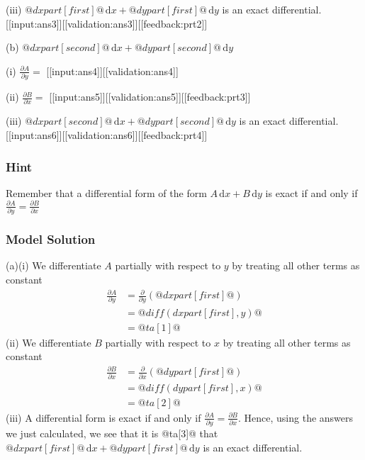 \documentclass[a4paper,10pt]{article}
\begin{document}
(iii) $@dxpart[first]@ \, \text{d}x + @dypart[first]@ \, \text{d}y$ is an exact differential. [[input:ans3]][[validation:ans3]][[feedback:prt2]]

(b) $@dxpart[second]@ \, \text{d}x + @dypart[second]@ \, \text{d}y$

(i) $\frac{\partial A}{\partial y} = $ [[input:ans4]][[validation:ans4]]

(ii) $\frac{\partial B}{\partial x} = $ [[input:ans5]][[validation:ans5]][[feedback:prt3]]

(iii) $@dxpart[second]@ \, \text{d}x + @dypart[second]@ \, \text{d}y$ is an exact differential. [[input:ans6]][[validation:ans6]][[feedback:prt4]]
\subsubsection{Hint}
Remember that a differential form of the form $A \, \text{d}x + B \, \text{d}y$ is exact if and only if $\frac{\partial A}{\partial y} = \frac{\partial B}{\partial x}$
\subsubsection{Model Solution}
(a)(i) We differentiate $A$ partially with respect to $y$ by treating all other terms as constant \begin{align*} \frac{\partial A}{\partial y} &= \frac{\partial}{\partial y} \left( @dxpart[first]@ \right) \\ &= @diff(dxpart[first],y)@  \\ &= @ta[1]@ \end{align*}(ii) We differentiate $B$ partially with respect to $x$ by treating all other terms as constant \begin{align*} \frac{\partial B}{\partial x} &= \frac{\partial}{\partial x} \left( @dypart[first]@ \right) \\ &= @diff(dypart[first],x)@  \\ &= @ta[2]@ \end{align*}(iii) A differential form is exact if and only if $\frac{\partial A}{\partial y} = \frac{\partial B}{\partial x}$. Hence, using the answers we just calculated, we see that it is @ta[3]@ that $@dxpart[first]@ \, \text{d}x + @dypart[first]@ \, \text{d}y$ is an exact differential.
\end{document}
